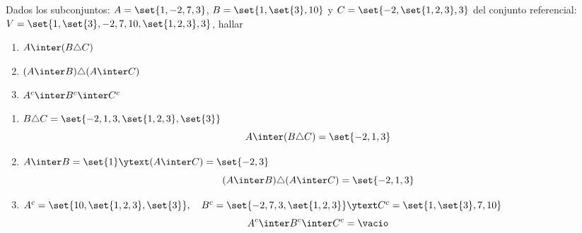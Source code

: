 \begin{enunciado}{\ejercicio}
  Dados los subconjuntos: $A = \set{1, -2, 7, 3}$, $B = \set{1, \set{3}, 10}$ y $C = \set{-2,\set{1,2,3},3}$
  del conjunto referencial: $V = \set{1,\set{3}, -2,7, 10, \set{1,2,3},3}$, hallar

  \begin{multicols}{3}
    \begin{enumerate}[label=(\alph*)]
      \item $A \inter (B \triangle C)$
      \item $(A \inter B) \triangle (A \inter C)$
      \item $A^c \inter B^c \inter C^c$
    \end{enumerate}
  \end{multicols}

\end{enunciado}

\begin{enumerate}[label=\alph*)]
  \item $B \triangle C = \set{ -2, 1, 3, \set{1,2,3}, \set{3}}$
        $$
          A \inter (B \triangle C) = \set{-2,1,3}
        $$

  \item $A \inter B = \set{1} \ytext (A \inter C)  = \set{-2,3}$
        $$
                (A \inter B) \triangle (A \inter C) = \set{-2,1 ,3}
        $$

  \item $A^c = \set{10, \set{1,2,3},\set{3}}, \quad B^c = \set{-2, 7, 3, \set{1,2,3}} \ytext C^c = \set{1,\set{3}, 7, 10}$
        $$
          A^c \inter B^c \inter C^c = \vacio
        $$
\end{enumerate}

